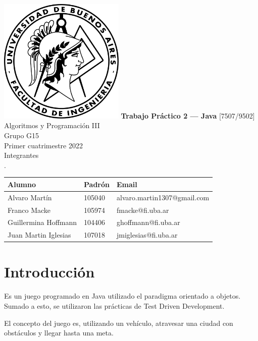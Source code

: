 \documentclass[titlepage,a4paper]{article}
\begin{document}
\begin{titlepage} %
	\hfill\includegraphics[width=6cm]{logofiuba.jpg}
    \centering
    \vfill
    \Huge \textbf{Trabajo Práctico 2 — Java}
    \vskip2cm
    \Large [7507/9502] Algoritmos y Programación III\\
    Grupo G15 \\
    Primer cuatrimestre 2022 \\
    \vfill
    Integrantes \\
    .\\
    \begin{tabular}{ | l | l | l | } %
      \hline
      Alumno & Padrón & Email \\ \hline
      Alvaro Martín & 105040 & alvaro.martin1307@gmail.com \\ \hline
      Franco Macke & 105974 & fmacke@fi.uba.ar \\ \hline
      Guillermina Hoffmann & 104406 & ghoffmann@fi.uba.ar \\ \hline
      Juan Martin Iglesias & 107018 & jmiglesias@fi.uba.ar \\ \hline
  	\end{tabular}
    \vfill
    \vfill
\end{titlepage}

\tableofcontents %
\newpage

\section{Introducción}\label{sec:intro}

Es un juego programado en Java utilizado el paradigma orientado a objetos. Sumado a esto, se utilizaron las prácticas de Test Driven Development.

El concepto del juego es, utilizando un vehículo, atravesar una ciudad con obstáculos y llegar hasta una meta.
\end{document}
